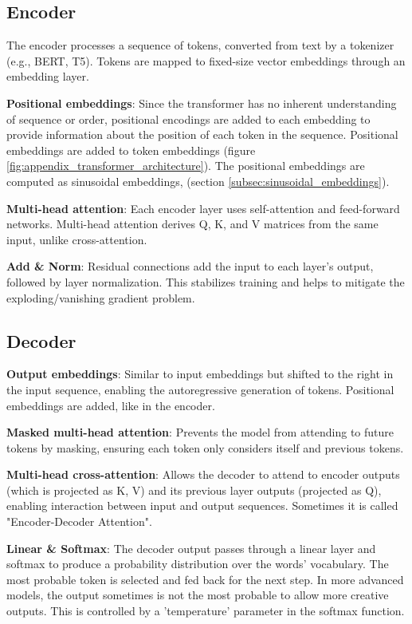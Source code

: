 \subsection*{Encoder}

The encoder processes a sequence of tokens, converted from text by a tokenizer (e.g., BERT, T5). Tokens are mapped to fixed-size vector embeddings through an embedding layer.

\textbf{Positional embeddings}: Since the transformer has no inherent understanding of sequence or order, positional encodings are added to each embedding to provide information about the position of each token in the sequence. Positional embeddings are added to token embeddings (figure \ref{fig:appendix_transformer_architecture}). The positional embeddings are computed as sinusoidal embeddings, (section \ref{subsec:sinusoidal_embeddings}).

\textbf{Multi-head attention}: Each encoder layer uses self-attention and feed-forward networks. Multi-head attention derives Q, K, and V matrices from the same input, unlike cross-attention.

\textbf{Add \& Norm}: Residual connections add the input to each layer's output, followed by layer normalization. This stabilizes training and helps to mitigate the exploding/vanishing gradient problem.









\subsection*{Decoder}

\textbf{Output embeddings}: Similar to input embeddings but shifted to the right in the input sequence, enabling the autoregressive generation of tokens. Positional embeddings are added, like in the encoder.

\textbf{Masked multi-head attention}: Prevents the model from attending to future tokens by masking, ensuring each token only considers itself and previous tokens.

\textbf{Multi-head cross-attention}: Allows the decoder to attend to encoder outputs (which is projected as K, V) and its previous layer outputs (projected as Q), enabling interaction between input and output sequences. Sometimes it is called "Encoder-Decoder Attention".

\textbf{Linear \& Softmax}: The decoder output passes through a linear layer and softmax to produce a probability distribution over the words' vocabulary. The most probable token is selected and fed back for the next step. In more advanced models, the output sometimes is not the most probable to allow more creative outputs. This is controlled by a 'temperature' parameter in the softmax function.

